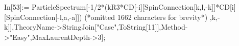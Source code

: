 In[53]:= ParticleSpectrum[-1/2*(kR3*CD[-i][SpinConnection[k,l,-k]]*CD[i][SpinConnection[-l,a,-a]]) (*omitted 1662 characters for brevity*) ,k,-k]],TheoryName->StringJoin["Case",ToString[11]],Method->"Easy",MaxLaurentDepth->3];